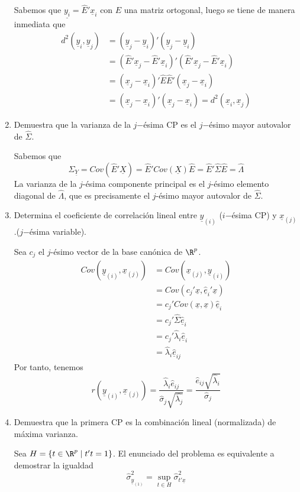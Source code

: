 \documentclass[twoside]{article}
\newcommand{\muestra}[1]{{\underline{#1}}}
\newcommand{\m}[1]{{\muestra{#1}}}
\newcommand{\ev}{\m{\hat{e}}}
\begin{document}
\begin{enumerate}
Sabemos que $\muestra{y_i} = \hat{E}'\m{x}_i$ con $E$ una matriz ortogonal, luego se tiene de manera inmediata que 
\begin{align*}
d^2(\m{y}_i,\m{y}_j)&=(\m{y}_j-\m{y}_i)'(\m{y}_j-\m{y}_i)\\
& = (\hat{E}'\m{x}_j-\hat{E}'\m{x}_i)'(\hat{E}'\m{x}_j-\hat{E}'\m{x}_i)\\
& = (\m{x}_j-\m{x}_i)'\hat{E}\hat{E}'(\m{x}_j-\m{x}_i)\\
& = (\m{x}_j-\m{x}_i) '(\m{x}_j-\m{x}_i) = d^2(\m{x}_i,\m{x}_j)
\end{align*}

\item Demuestra que la varianza de la $j$−ésima CP es el $j$−ésimo mayor autovalor de $\widehat{\Sigma}$.

Sabemos que $$\Sigma_{\muestra{Y}} = Cov(\hat{E}'\muestra{X})= \hat{E}'Cov(\muestra{X})\hat{E} =\hat{E}' \hat{\Sigma}\hat{E}= \hat{\Lambda}$$
La varianza de la $j$-ésima componente principal es el $j$-ésimo elemento diagonal de $\hat{\Lambda}$, que es precisamente el $j$-ésimo mayor autovalor de $\hat{\Sigma}$.

\item Determina el coeficiente de correlación lineal entre $\muestra{y}_{{(i)}}$ ($i$−ésima CP) y $\muestra{x}_{(j)}$ .($j$−ésima variable).

Sea $c_j$ el $j$-ésimo vector de la base canónica de $\R^p$.
\begin{align*}
Cov(\muestra{y}_{{(i)}},\muestra{x}_{{(j)}}) &= Cov(\muestra{x}_{{(j)}},\muestra{y}_{{(i)}})\\
& = Cov(c_j'\muestra{x},\ev_i' \muestra{x})\\
&= c_j'Cov(\muestra{x},\muestra{x})\ev_i \\
&= c_j'\hat{\Sigma}\ev_i \\
&= c_j' \hat{\lambda}_i\ev_i \\
&= \hat{\lambda}_i \ev_{ij}
\end{align*} 
Por tanto, tenemos
$$
r(\muestra{y}_{{(i)}},\muestra{x}_{{(j)}}) = \frac{\hat{\lambda}_i \hat{e}_{ij}}{\hat{\sigma}_{j}\sqrt{\hat{\lambda_j}}} = \frac{\hat{e}_{ij}\sqrt{\hat{\lambda}_i}}{\hat{\sigma}_j}
$$
\newpage
\item Demuestra que la primera CP es la combinación lineal (normalizada) de máxima varianza. 

Sea $H=\{t\in \R^p \mid t't=1\}$. El enunciado del problema es equivalente a demostrar la igualdad
$$
\hat{\sigma}_{\muestra{y}_{(1)}}^2=\sup_{t\in H}\hat{\sigma}^2_{t'\muestra{x}}
$$


\end{enumerate}
\end{document}
